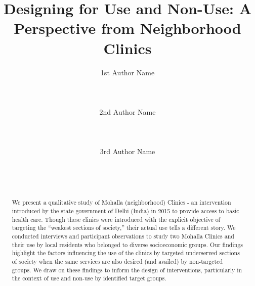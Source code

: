 \documentclass{sigchi}
\begin{document}
\title{Designing for Use and Non-Use: A Perspective from Neighborhood Clinics}
\author{
  \alignauthor 1st Author Name\\
    \\
    \\
    \\
  \alignauthor 2nd Author Name\\
    \\
    \\
    \\
  \alignauthor 3rd Author Name\\
    \\
    \\
    \\
}

\maketitle
\begin{abstract}
We present a qualitative study of Mohalla (neighborhood) Clinics - an intervention introduced by the state government of Delhi (India) in 2015 to provide access to basic health care. Though these clinics were introduced with the explicit objective of targeting the ``weakest sections of society,'' their actual use tells a different story. We conducted interviews and participant observations to study two Mohalla Clinics and their use by local residents who belonged to diverse socioeconomic groups. Our findings highlight the factors influencing the use of the clinics by targeted underserved sections of society when the same services are also desired (and availed) by non-targeted groups. We draw on these findings to inform the design of interventions, particularly in the context of use and non-use by identified target groups.

\end{abstract}








\end{document}
